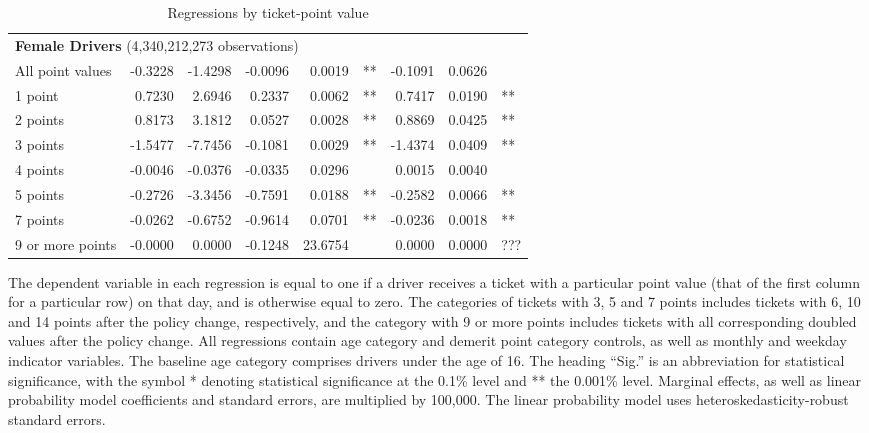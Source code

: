 \begin{table}
\begin{tabular}{l r r r r l r r l}
\hline 

\multicolumn{8}{l}{\textbf{Female Drivers} (4,340,212,273 observations)} \\ 

All point values                &  -0.3228        &  -1.4298       &  -0.0096        &  0.0019       &   **       &  -0.1091        &  0.0626       &            \\ 
1 point                         &  0.7230        &  2.6946       &  0.2337        &  0.0062       &   **       &  0.7417        &  0.0190       &   **       \\ 
2 points                        &  0.8173        &  3.1812       &  0.0527        &  0.0028       &   **       &  0.8869        &  0.0425       &   **       \\ 
3 points                        &  -1.5477        &  -7.7456       &  -0.1081        &  0.0029       &   **       &  -1.4374        &  0.0409       &   **       \\ 
4 points                        &  -0.0046        &  -0.0376       &  -0.0335        &  0.0296       &            &  0.0015        &  0.0040       &            \\ 
5 points                        &  -0.2726        &  -3.3456       &  -0.7591        &  0.0188       &   **       &  -0.2582        &  0.0066       &   **       \\ 
7 points                        &  -0.0262        &  -0.6752       &  -0.9614        &  0.0701       &   **       &  -0.0236        &  0.0018       &   **       \\ 
9 or more points                &  -0.0000        &  0.0000       &  -0.1248        &  23.6754       &            &  0.0000        &  0.0000       &  ???       \\ 

\hline 

\end{tabular} 
\caption{Regressions by ticket-point value} 
The dependent variable in each regression is equal to one  
if a driver receives a ticket with a particular point value   
(that of the first column for a particular row) on that day,  
and is otherwise equal to zero. 
The categories of tickets with 3, 5 and 7 points includes tickets  
with 6, 10 and 14 points after the policy change, respectively,  
and the category with 9 or more points includes tickets  
with all corresponding doubled values after the policy change. 
All regressions contain age category and demerit point category controls, 
as well as monthly and weekday indicator variables. 
The baseline age category comprises drivers under the age of 16. 
The heading ``Sig.'' is an abbreviation for statistical significance, with 
the symbol * denoting statistical significance at the 0.1\% level 
and ** the 0.001\% level. 
Marginal effects, as well as linear probability model coefficients and standard errors, are  
multiplied by 100,000.  
The linear probability model uses heteroskedasticity-robust standard errors.  
\label{tab:seas_Logit_vs_LPMx100K_regs_by_points} 
\end{table} 
 
